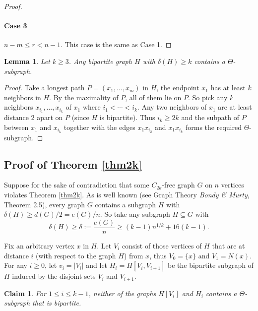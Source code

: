 \documentclass[12pt]{article}
\newtheorem{lemma}{Lemma}
\newtheorem{claim}{Claim}
\begin{document}
\begin{proof}
	\vspace{-1em}
	\paragraph{Case 3} $n - m\leq r<n - 1$. This case is the same as Case 1.
\end{proof}

\begin{lemma}\label{thetasublem}
	Let $ k \geq 3 $. Any bipartite graph $H$ with $\delta(H)\geq k$ contains a $\Theta$-subgraph.
\end{lemma}
\begin{proof}
	Take a longest path $ P=(x_1, \ldots, x_m) $ in $ H $, the endpoint $ x_1 $ has at least $ k $ neighbors in $ H $. By the maximality of $ P $, all of them lie on $ P $. So pick any $ k $ neighbors $ x_{i_1}, \ldots, x_{i_k} $ of $ x_1 $ where $ i_1 < \cdots < i_k $. Any two neighbors of $x_1$ are at least distance 2 apart on $P$ (since $H$ is bipartite). Thus $ i_k \geq 2k $ and the subpath of $ P $ between $ x_1 $ and $ x_{i_k} $ together with the edges $ x_1 x_{i_2} $ and $ x_1 x_{i_k} $ forms the required $ \Theta $-subgraph.
\end{proof}

\subsection{Proof of Theorem \ref{thm2k}}
Suppose for the sake of contradiction that some $ C_{2k} $-free graph $ G $ on $ n $ vertices violates Theorem \ref{thm2k}. As is well known (see Graph Theory \textit{Bondy \& Murty}, Theorem 2.5), every graph $ G $ contains a subgraph $H$ with $\delta(H)\geq d(G)/2=e(G)/n$. So take any subgraph $H\subseteq G$ with
\[
\delta(H)\geq \delta := \frac{e(G)}{n} \geq (k-1) n^{1/k} + 16(k-1).
\]

Fix an arbitrary vertex $ x $ in $ H $. Let $ V_i $ consist of those vertices of $ H $ that are at distance $ i $ (with respect to the graph $ H $) from $ x $, thus $ V_0 = \{ x \} $ and $ V_1 = N(x) $. For any $ i \geq 0 $, let $ v_i = |V_i| $ and let $H_i = H[V_i, V_{i+1}]$ be the bipartite subgraph of $ H $ induced by the disjoint sets $ V_i $ and $ V_{i+1} $.
\begin{claim}
	For $ 1 \leq i \leq k - 1 $, neither of the graphs $ H[V_i] $ and $ H_i $ contains a $ \Theta $-subgraph that is bipartite.
\end{claim}
\end{document}
